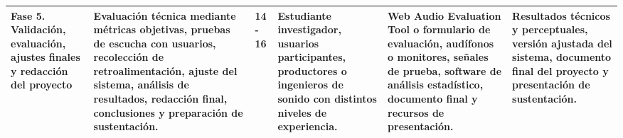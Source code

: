 \begin{longtable}{|p{2.2cm}|p{3.5cm}|p{1.0cm}|p{1.8cm}|p{2.8cm}|p{2.8cm}|}
\hline
Fase 5. Validación, evaluación, ajustes finales y redacción del proyecto & Evaluación técnica mediante métricas objetivas, pruebas de escucha con usuarios, recolección de retroalimentación, ajuste del sistema, análisis de resultados, redacción final, conclusiones y preparación de sustentación. & 14 - 16 & Estudiante investigador, usuarios participantes, productores o ingenieros de sonido con distintos niveles de experiencia. & Web Audio Evaluation Tool o formulario de evaluación, audífonos o monitores, señales de prueba, software de análisis estadístico, documento final y recursos de presentación. & Resultados técnicos y perceptuales, versión ajustada del sistema, documento final del proyecto y presentación de sustentación. \\
\hline
\end{longtable}
